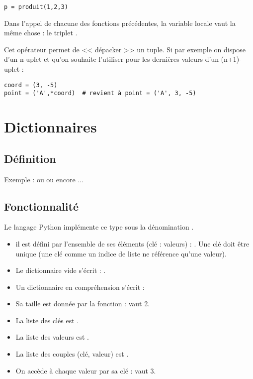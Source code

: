 {\begin{verbatim}
p = produit(1,2,3)
\end{verbatim}

Dans l'appel de chacune des fonctions précédentes, la variable locale  vaut la même chose : le triplet .

\medskip

Cet opérateur permet de << dépacker >> un tuple. Si par exemple on dispose d'un n-uplet et qu'on souhaite l'utiliser pour les dernières valeurs d'un (n+1)-uplet :

\vspace{-2ex}
\begin{verbatim}
coord = (3, -5)
point = ('A',*coord)  # revient à point = ('A', 3, -5)
\end{verbatim}

\section{Dictionnaires}

\subsection{Définition}


Exemple :  ou  ou encore ...

\subsection{Fonctionnalité}

Le langage Python implémente ce type sous la dénomination .

\begin{itemize}
	\item il est défini par l'ensemble de ses éléments (clé : valeurs) : . Une clé doit être unique (une clé comme un indice de liste ne référence qu'une valeur).
	\item Le dictionnaire vide s'écrit : .
	\item Un dictionnaire en compréhension s'écrit : 
	\item Sa taille est donnée par la fonction  :  vaut 2.
	\item La liste des clés est .
	\item La liste des valeurs est .
	\item La liste des couples (clé, valeur) est .
	\item On accède à chaque valeur par sa clé :  vaut 3.
	

\end{itemize}}
